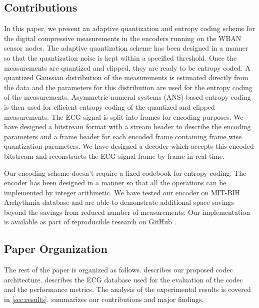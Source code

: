 \subsection{Contributions}
In this paper, we present an adaptive quantization and
entropy coding scheme for the digital compressive measurements
in the encoders running on the WBAN sensor nodes.
The adaptive quantization scheme has been designed in a manner
so that the quantization noise is kept within a specified
threshold. Once the measurements are quantized and clipped,
they are ready to be entropy coded. A quantized Gaussian
distribution of the measurements is estimated directly from
the data and the parameters for this distribution are used
for the entropy coding of the measurements.  
Asymmetric numeral systems (ANS) based
entropy coding is then used for efficient entropy coding
of the quantized and clipped measurements.
The ECG signal is split into frames for encoding purposes.
We have designed a bitstream format with a stream header
to describe the encoding parameters and a frame header
for each encoded frame containing frame wise quantization
parameters. We have designed a decoder which accepts this
encoded bitstream and reconstructs the ECG signal frame by
frame in real time. 

Our encoding scheme doesn't require a fixed codebook
for entropy coding. The encoder has been
designed in a manner so that all the operations can
be implemented by integer arithmetic. We have
tested our encoder on MIT-BIH Arrhythmia database
and are able to demonstrate additional space savings
beyond the savings from reduced number of measurements.
Our implementation is available as part of
reproducible research on GitHub \cite{kumar2022ecgcodec}.

\subsection{Paper Organization}
The rest of the paper is organized as follows.
 describes our proposed codec architecture.
 describes the ECG database
used for the evaluation of the codec and the
performance metrics.
The analysis of the experimental results is covered in \cref{sec:results}.
 summarizes our contributions and major findings.

